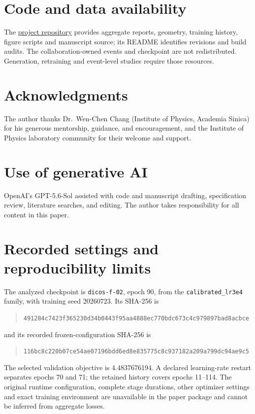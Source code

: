 \documentclass[10pt]{article}
\begin{document}
\section*{Code and data availability}

The \href{https://github.com/JulianAttemptsCoding/fast-mc-paper}{project repository} provides aggregate reports, geometry, training history, figure scripts and manuscript source; its README identifies revisions and build audits. The collaboration-owned events and checkpoint are not redistributed. Generation, retraining and event-level studies require those resources.

\section*{Acknowledgments}

The author thanks Dr.~Wen-Chen Chang (Institute of Physics, Academia Sinica) for his generous mentorship, guidance, and encouragement, and the Institute of Physics laboratory community for their welcome and support.

\section*{Use of generative AI}

OpenAI's GPT-5.6-Sol assisted with code and manuscript drafting, specification review, literature searches, and editing. The author takes responsibility for all content in this paper.


\appendix
\section{Recorded settings and reproducibility limits}
\label{app:reproducibility}

The analyzed checkpoint is \texttt{dicos-f-02}, epoch 90, from the \texttt{calibrated\_lr3e4} family, with training seed 20260723. Its SHA-256 is
\begin{quote}\footnotesize\nolinkurl{491284c7423f365230d34b0443f95aa4888ec770bdc673c4c979897bad8acbce}\end{quote}
and its recorded frozen-configuration SHA-256 is
\begin{quote}\footnotesize\nolinkurl{116bc8c220b07ce54ae07196bdd6ed8e835775c8c937182a209a799dc94ae9c5}\end{quote}
The selected validation objective is 4.4837676194. A declared learning-rate restart separates epochs 70 and 71; the retained history covers epochs 11--114. The original runtime configuration, complete stage durations, other optimizer settings and exact training environment are unavailable in the paper package and cannot be inferred from aggregate losses.
\end{document}
